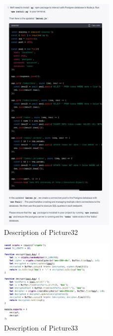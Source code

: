 \documentclass[runningheads]{llncs}
\begin{document}
\begin{figure}[h]
    \centering
    \includegraphics[width=0.5\textwidth]{Pictures/Picture32.jpg}
    \caption{Description of Picture32}
    \label{fig:picture32}
\end{figure}
\begin{figure}[h]
    \centering
    \includegraphics[width=0.5\textwidth]{Pictures/Picture33.jpg}
    \caption{Description of Picture33}
    \label{fig:picture33}
\end{figure}
\end{document}
